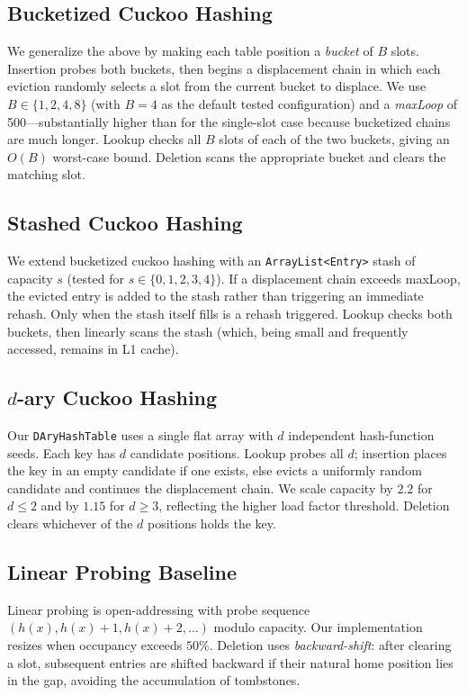 \documentclass[10pt,journal,compsoc]{IEEEtran}
\begin{document}
\subsection{Bucketized Cuckoo Hashing}
We generalize the above by making each table position a \emph{bucket} of $B$ slots. Insertion probes both buckets, then begins a displacement chain in which each eviction randomly selects a slot from the current bucket to displace. We use $B\in\{1,2,4,8\}$ (with $B=4$ as the default tested configuration) and a \emph{maxLoop} of 500---substantially higher than for the single-slot case because bucketized chains are much longer. Lookup checks all $B$ slots of each of the two buckets, giving an $O(B)$ worst-case bound. Deletion scans the appropriate bucket and clears the matching slot.

\subsection{Stashed Cuckoo Hashing}
We extend bucketized cuckoo hashing with an \texttt{ArrayList<Entry>} stash of capacity $s$ (tested for $s\in\{0,1,2,3,4\}$). If a displacement chain exceeds maxLoop, the evicted entry is added to the stash rather than triggering an immediate rehash. Only when the stash itself fills is a rehash triggered. Lookup checks both buckets, then linearly scans the stash (which, being small and frequently accessed, remains in L1 cache).

\subsection{$d$-ary Cuckoo Hashing}
Our \texttt{DAryHashTable} uses a single flat array with $d$ independent hash-function seeds. Each key has $d$ candidate positions. Lookup probes all $d$; insertion places the key in an empty candidate if one exists, else evicts a uniformly random candidate and continues the displacement chain. We scale capacity by $2.2$ for $d\le 2$ and by $1.15$ for $d\ge 3$, reflecting the higher load factor threshold. Deletion clears whichever of the $d$ positions holds the key.

\subsection{Linear Probing Baseline}
Linear probing is open-addressing with probe sequence $(h(x), h(x)+1, h(x)+2, \ldots)$ modulo capacity. Our implementation resizes when occupancy exceeds $50\%$. Deletion uses \emph{backward-shift}: after clearing a slot, subsequent entries are shifted backward if their natural home position lies in the gap, avoiding the accumulation of tombstones.
\end{document}
